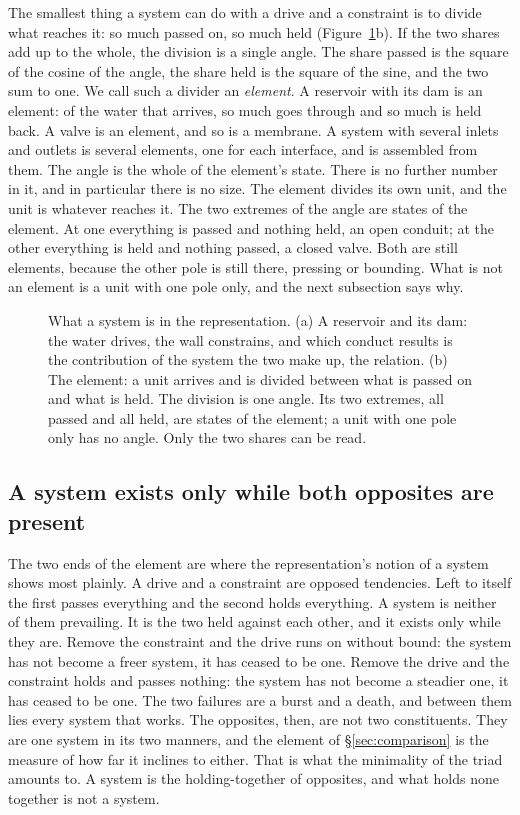 \documentclass[11pt,a4paper]{article}
\theoremstyle{plain}
\theoremstyle{definition}
\theoremstyle{remark}
\begin{document}
The smallest thing a system can do with a drive and a constraint is to divide what reaches it: so much passed on, so much held (Figure~\ref{fig:system}b). If the two shares add up to the whole, the division is a single angle. The share passed is the square of the cosine of the angle, the share held is the square of the sine, and the two sum to one. We call such a divider an \emph{element}. A reservoir with its dam is an element: of the water that arrives, so much goes through and so much is held back. A valve is an element, and so is a membrane. A system with several inlets and outlets is several elements, one for each interface, and is assembled from them. The angle is the whole of the element's state. There is no further number in it, and in particular there is no size. The element divides its own unit, and the unit is whatever reaches it. The two extremes of the angle are states of the element. At one everything is passed and nothing held, an open conduit; at the other everything is held and nothing passed, a closed valve. Both are still elements, because the other pole is still there, pressing or bounding. What is not an element is a unit with one pole only, and the next subsection says why.

\begin{figure}[!htbp]
\centering

\caption{What a system is in the representation. (a) A reservoir and its dam: the water drives, the wall constrains, and which conduct results is the contribution of the system the two make up, the relation. (b) The element: a unit arrives and is divided between what is passed on and what is held. The division is one angle. Its two extremes, all passed and all held, are states of the element; a unit with one pole only has no angle. Only the two shares can be read.}
\label{fig:system}
\end{figure}

\subsection{A system exists only while both opposites are present}

The two ends of the element are where the representation's notion of a system shows most plainly. A drive and a constraint are opposed tendencies. Left to itself the first passes everything and the second holds everything. A system is neither of them prevailing. It is the two held against each other, and it exists only while they are. Remove the constraint and the drive runs on without bound: the system has not become a freer system, it has ceased to be one. Remove the drive and the constraint holds and passes nothing: the system has not become a steadier one, it has ceased to be one. The two failures are a burst and a death, and between them lies every system that works. The opposites, then, are not two constituents. They are one system in its two manners, and the element of \S\ref{sec:comparison} is the measure of how far it inclines to either. That is what the minimality of the triad amounts to. A system is the holding-together of opposites, and what holds none together is not a system.
\end{document}
